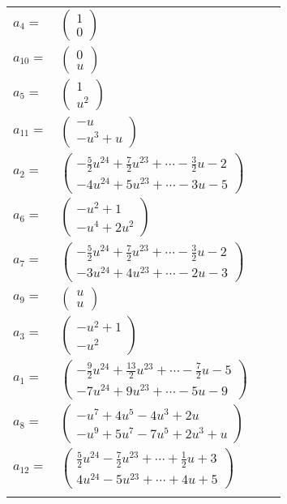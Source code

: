 \documentclass[1p]{elsarticle_modified}
\theoremstyle{definition}
\begin{document}
\begin{tabular}{m{7pt} m{180pt} m{7pt} m{180pt} }
\flushright $a_{4}=$&$\begin{pmatrix}1\\0\end{pmatrix}$ \\
\flushright $a_{10}=$&$\begin{pmatrix}0\\u\end{pmatrix}$ \\
\flushright $a_{5}=$&$\begin{pmatrix}1\\u^2\end{pmatrix}$ \\
\flushright $a_{11}=$&$\begin{pmatrix}- u\\- u^3+u\end{pmatrix}$ \\
\flushright $a_{2}=$&$\begin{pmatrix}-\frac{5}{2} u^{24}+\frac{7}{2} u^{23}+\cdots-\frac{3}{2} u-2\\-4 u^{24}+5 u^{23}+\cdots-3 u-5\end{pmatrix}$ \\
\flushright $a_{6}=$&$\begin{pmatrix}- u^2+1\\- u^4+2 u^2\end{pmatrix}$ \\
\flushright $a_{7}=$&$\begin{pmatrix}-\frac{5}{2} u^{24}+\frac{7}{2} u^{23}+\cdots-\frac{3}{2} u-2\\-3 u^{24}+4 u^{23}+\cdots-2 u-3\end{pmatrix}$ \\
\flushright $a_{9}=$&$\begin{pmatrix}u\\u\end{pmatrix}$ \\
\flushright $a_{3}=$&$\begin{pmatrix}- u^2+1\\- u^2\end{pmatrix}$ \\
\flushright $a_{1}=$&$\begin{pmatrix}-\frac{9}{2} u^{24}+\frac{13}{2} u^{23}+\cdots-\frac{7}{2} u-5\\-7 u^{24}+9 u^{23}+\cdots-5 u-9\end{pmatrix}$ \\
\flushright $a_{8}=$&$\begin{pmatrix}- u^7+4 u^5-4 u^3+2 u\\- u^9+5 u^7-7 u^5+2 u^3+u\end{pmatrix}$ \\
\flushright $a_{12}=$&$\begin{pmatrix}\frac{5}{2} u^{24}-\frac{7}{2} u^{23}+\cdots+\frac{1}{2} u+3\\4 u^{24}-5 u^{23}+\cdots+4 u+5\end{pmatrix}$\\&\end{tabular}
\end{document}
